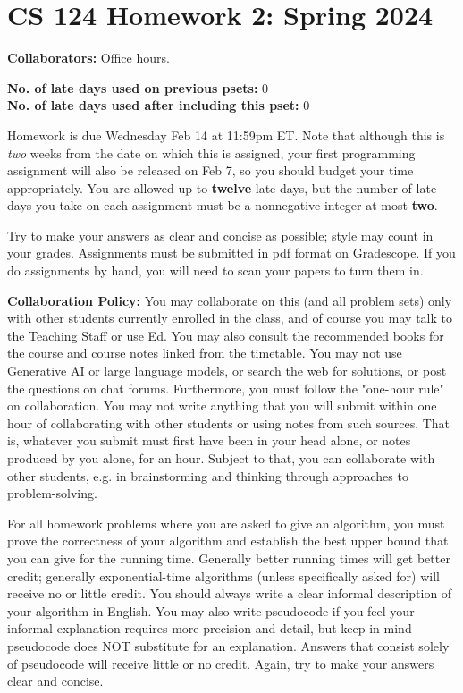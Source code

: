 \documentclass[11pt]{article}
\begin{document}


        \section*{CS 124 Homework 2: Spring 2024}


        \textbf{Collaborators: } Office hours.

        \textbf{No. of late days used on previous psets:} 0\\
        \textbf{No. of late days used after including this pset:} 0

Homework is due {\color{blue} Wednesday Feb 14 at 11:59pm ET}. {\color{brown} Note that although this is \emph{two} weeks from the date on which this is assigned, your first programming assignment will also be released on Feb 7, so you should budget your time appropriately.} You are allowed up to {\bf twelve} late days, but the number of late days you take on each assignment must be a nonnegative integer at most {\bf two}. 

Try to make your answers as clear and concise as possible;
style may count in your grades. Assignments must be submitted in pdf format on Gradescope. If you do assignments by hand, you will need to scan your papers to turn them in.


{\bf Collaboration Policy:} You may collaborate on this (and all problem sets) only with other students currently enrolled in the class, and of course you may talk to the Teaching Staff or use Ed. You may also consult the recommended books for the course and course notes linked from the timetable. You may not use Generative AI or large language models, or search the web for solutions, or post the questions on chat forums. Furthermore, you must follow the "one-hour rule" on collaboration.  You may not write anything that you will submit within one hour of collaborating with other students or using notes from such sources. That is, whatever you submit must first have been in your head alone, or notes produced by you alone, for an hour. Subject to that, you can collaborate with other students, e.g. in brainstorming and thinking through approaches to problem-solving.


For all homework problems where you are asked to give an algorithm, you must prove the correctness
of your algorithm and establish the best upper bound that you can give for the running time. Generally
better running times will get better credit; generally exponential-time algorithms (unless specifically asked
for) will receive no or little credit. You should always write a clear informal description of your algorithm
in English. You may also write pseudocode if you feel your informal explanation requires more precision
and detail, but keep in mind pseudocode does NOT substitute for an explanation. Answers that consist
solely of pseudocode will receive little or no credit. Again, try to make your answers clear and concise.
\end{document}
